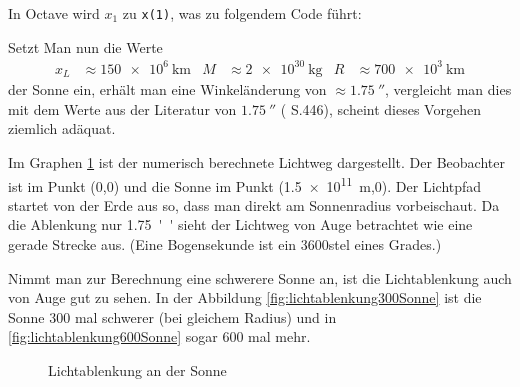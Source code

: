 \begin{refsection}
\begin{beispiel}
  In Octave wird \(x_1\) zu \texttt{x(1)}, was zu folgendem Code
  führt:
  

  Setzt Man nun die Werte
  \begin{align*}
    x_L &\approx \SI{150e6}{\kilo\meter} &M &\approx
                                              \SI{2e30}{\kilogram}
    &R &\approx \SI{700e3}{\kilo\meter}
  \end{align*}
  der Sonne ein,
  erhält man eine Winkeländerung von \(\approx \SI{1.75}{''}\),
  vergleicht man dies mit dem Werte aus der Literatur von
  \(\SI{1.75}{''}\) (\cite{misner1973gravitation} S.446), scheint
  dieses Vorgehen ziemlich adäquat.

  Im Graphen \ref{fig:lichtablenkungSonne} ist der numerisch
  berechnete Lichtweg dargestellt.  Der Beobachter ist im Punkt (0,0)
  und die Sonne im Punkt (\SI{1.5e11}{\meter},0).  Der Lichtpfad
  startet von der Erde aus so, dass man direkt am Sonnenradius
  vorbeischaut.  Da die Ablenkung nur \SI{1.75}{''} sieht der Lichtweg
  von Auge betrachtet wie eine gerade Strecke aus.  (Eine Bogensekunde
  ist ein 3600stel eines Grades.)

  Nimmt man zur Berechnung eine schwerere Sonne an, ist die
  Lichtablenkung auch von Auge gut zu sehen.  In der Abbildung
  \ref{fig:lichtablenkung300Sonne} ist die Sonne 300 mal schwerer (bei
  gleichem Radius) und in \ref{fig:lichtablenkung600Sonne} sogar 600
  mal mehr.

  \begin{figure}
    \centering
    \caption{Lichtablenkung an der Sonne}
    \label{fig:lichtablenkungSonne}
  \end{figure}
  

\end{beispiel}
\end{refsection}
